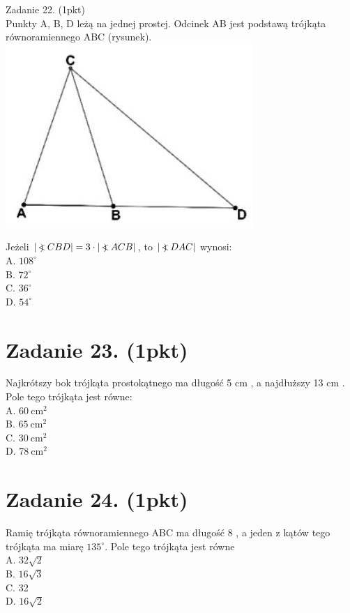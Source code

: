 \documentclass[10pt]{article}
\newcommand\Varangle{\mathop{{<\!\!\!\!\!\text{\small)}}\:}\nolimits}
\begin{document}
Zadanie 22. (1pkt)\\
Punkty A, B, D leżą na jednej prostej. Odcinek AB jest podstawą trójkąta równoramiennego ABC (rysunek).\\
\includegraphics[max width=\textwidth, center]{2024_11_21_23d228cacd5e4a9a3f86g-06}

Jeżeli \(|\Varangle C B D|=3 \cdot|\Varangle A C B|\), to \(|\Varangle D A C|\) wynosi:\\
A. \(108^{\circ}\)\\
B. \(72^{\circ}\)\\
C. \(36^{\circ}\)\\
D. \(54^{\circ}\)

\section*{Zadanie 23. (1pkt)}
Najkrótszy bok trójkąta prostokątnego ma długość 5 cm , a najdłuższy 13 cm . Pole tego trójkąta jest równe:\\
A. \(60 \mathrm{~cm}^{2}\)\\
B. \(65 \mathrm{~cm}^{2}\)\\
C. \(30 \mathrm{~cm}^{2}\)\\
D. \(78 \mathrm{~cm}^{2}\)

\section*{Zadanie 24. (1pkt)}
Ramię trójkąta równoramiennego ABC ma długość 8 , a jeden z kątów tego trójkąta ma miarę \(135^{\circ}\). Pole tego trójkąta jest równe\\
A. \(32 \sqrt{2}\)\\
B. \(16 \sqrt{3}\)\\
C. 32\\
D. \(16 \sqrt{2}\)
\end{document}
